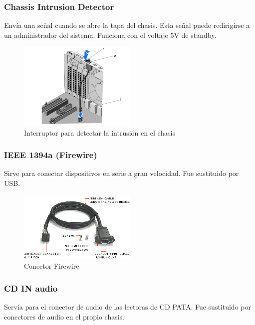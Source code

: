 \documentclass[12pt,spanish]{article}
\begin{document}
\subsubsection{Chassis Intrusion Detector}

Envía una señal cuando se abre la tapa del chasis. Esta señal puede redirigirse a un administrador del sistema. Funciona con el voltaje 5V de standby.

\begin{figure}[H]
	\centering
	\includegraphics[width=0.5\textwidth]{chassisintrusion.jpg}
	\caption{Interruptor para detectar la intrusión en el chasis}
\end{figure}

\subsubsection{IEEE 1394a (Firewire)}

Sirve para conectar dispositivos en serie a gran velocidad. Fue sustituido por USB.

\begin{figure}[H]
	\centering
	\includegraphics[width=0.5\textwidth]{firewire.png}
	\caption{Conector Firewire}
\end{figure}

\subsubsection{CD IN audio}

Servía para el conector de audio de las lectoras de CD PATA. Fue sustituido por conectores de audio en el propio chasis.
\end{document}
